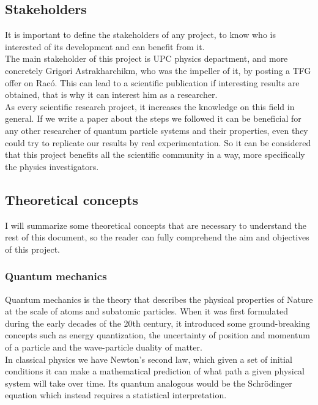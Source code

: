 \documentclass{article}
\begin{document}
\subsection{Stakeholders}
It is important to define the stakeholders of any project, to know who is interested of its development and can benefit from it.\\

The main stakeholder of this project is UPC physics department, and more concretely Grigori Astrakharchikm, who was the impeller of it, by posting a TFG offer on Racó. This can lead to a scientific publication if interesting results are obtained, that is why it can interest him as a researcher.\\

As every scientific research project, it increases the knowledge on this field in general. If we write a paper about the steps we followed it can be beneficial for any other researcher of quantum particle systems and their properties, even they could try to replicate our results by real experimentation. So it can be considered that this project benefits all the scientific community in a way, more specifically the physics investigators.  

\subsection{Theoretical concepts}
I will summarize some theoretical concepts that are necessary to understand the rest of this document, so the reader can fully comprehend the aim and objectives of this project.

\subsubsection{Quantum mechanics}
Quantum mechanics is the theory that describes the physical properties of Nature at the scale of atoms and subatomic particles. When it was first formulated during the early decades of the 20th century, it introduced some ground-breaking concepts such as energy quantization, the uncertainty of position and momentum of a particle and the wave-particle duality of matter.\\

In classical physics we have Newton’s second law, which given a set of initial conditions it can make a mathematical prediction of what path a given physical system will take over time. Its quantum analogous would be the Schrödinger equation which instead requires a statistical interpretation.
\end{document}

